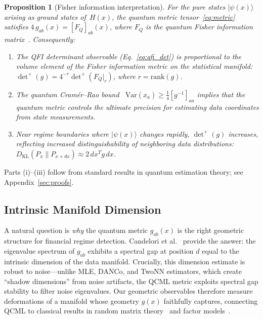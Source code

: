 \documentclass[3p]{elsarticle}
\newtheorem{proposition}[theorem]{Proposition}
\newcommand{\ket}[1]{|#1\rangle}
\begin{document}
\begin{proposition}[Fisher information interpretation]%
\label{prop:fisher}
For the pure states $\ket{\psi(x)}$ arising as ground states
of~$H(x)$, the quantum metric
tensor~\eqref{eq:metric} satisfies
$4\,g_{ab}(x) = [F_Q]_{ab}(x)$, where $F_Q$ is the quantum Fisher
information matrix~\cite{braunstein_caves1994,pezze2018,toth2014}.  Consequently:
\begin{enumerate}
\item[(i)] The QFI determinant observable
  (Eq.~\ref{eq:qfi_det}) is proportional to the volume element of
  the Fisher information metric on the statistical manifold:
  $\det^+(g) = 4^{-r}\det^+(F_Q|_r)$, where $r = \mathrm{rank}(g)$.
\item[(ii)] The quantum Cram\'{e}r--Rao bound~\cite{cramer1946,helstrom1976}
  $\mathrm{Var}(\hat{x}_a) \geq \tfrac{1}{4}[g^{-1}]_{aa}$
  implies that the quantum metric controls the ultimate precision
  for estimating data coordinates from state
  measurements.
\item[(iii)] Near regime boundaries where $\ket{\psi(x)}$ changes
  rapidly, $\det^+(g)$ increases, reflecting increased
  distinguishability of neighboring data distributions:
  $D_{\mathrm{KL}}(P_x \| P_{x+dx}) \approx 2\,dx^T g\,dx$.
\end{enumerate}
\end{proposition}
\noindent Parts (i)--(iii) follow from standard results in quantum
estimation theory; see Appendix~\ref{sec:proofs}.

\subsection{Intrinsic Manifold Dimension}\label{subsec:intrinsic_dim}

A natural question is \emph{why} the quantum metric $g_{ab}(x)$ is the
right geometric structure for financial regime detection.  Candelori et
al.~\cite{candelori2025} provide the answer: the eigenvalue spectrum of
$g_{ab}$ exhibits a spectral gap at position $d$ equal to the intrinsic
dimension of the data manifold.  Crucially, this dimension estimate is
robust to noise---unlike MLE, DANCo, and TwoNN estimators, which create
``shadow dimensions'' from noise artifacts, the QCML metric exploits
spectral gap stability to filter noise eigenvalues.  Our geometric
observables therefore measure deformations of a manifold whose geometry
$g(x)$ faithfully captures, connecting QCML to classical results in
random matrix theory~\cite{laloux1999,laloux2000} and factor
models~\cite{bai_ng2002}.
\end{document}
